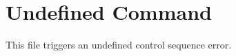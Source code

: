 \documentclass{article}
\begin{document}
\section{Undefined Command}
This file triggers an undefined control sequence error.
\undefinedcommand
\end{document}
